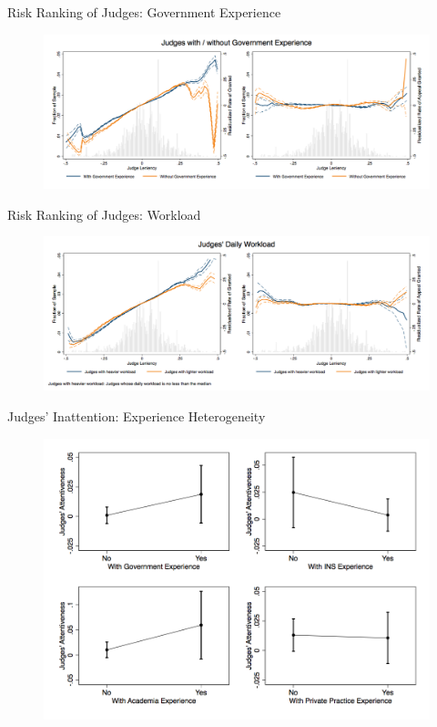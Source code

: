 \begin{frame}{Risk Ranking of Judges: Government Experience}
    \begin{figure}
        \centering
        \includegraphics[height = 0.7 \textheight]{images/comp_govt_dum.png}
    \end{figure}
\end{frame}

\begin{frame}{Risk Ranking of Judges: Workload}
    \begin{figure}
        \centering
        \includegraphics[height = 0.7 \textheight]{images/comp_judge_morecase_perday.png}
    \end{figure}
\end{frame}

\begin{frame}{Judges' Inattention: Experience Heterogeneity}
    \begin{figure}
        \centering
        \includegraphics[height = 0.8 \textheight]{images/judge_expdum_full.png}
    \end{figure}
\end{frame}

